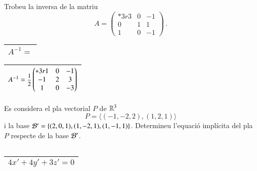 \documentclass[11pt,catalan]{article}
\begin{document}
\begin{enunciat}
Trobeu la inversa de la matriu 
\[
  A = \begin{pmatrix}{*{3}r} 3 & 0 & -1\\ 0 & 1 & 1\\ 1 & 0 & -1\end{pmatrix}\,.
\]
\end{enunciat}

\begin{quadricula}
\begin{tabular}{|L{5cm}{1.25cm}|}
\hline
$A^{-1}=$ \\
\hline
\end{tabular}
\end{quadricula}

\begin{solucio}
\begin{center}
\begin{tabular}{|C{5cm}{1.25cm}|}
\hline
$A^{-1}=\deufrac{1}{2}\begin{pmatrix}{*{3}r} 1 & 0 & -1\\ -1 & 2 & 3\\ 1 & 0 & -3\end{pmatrix}$ \\
\hline
\end{tabular}
\end{center}
\end{solucio}


\begin{enunciat}
Es considera el pla vectorial $P$ de $\rn 3$
\[
  P = \langle (-1,-2,2), (1,2,1) \rangle
\]
i la base $\cal B'=\{(2,0,1),(1,-2,1),(1,-1,1)\}$. Determineu l'equació implícita del pla $P$ respecte de la base $\cal B'$.
\end{enunciat}

\begin{quadricula}
\begin{tabular}{|C{5cm}{0.5cm}|}
\hline
 \\
\hline
\end{tabular}
\end{quadricula}

\begin{solucio}
\begin{center}
\begin{tabular}{|C{5cm}{0.5cm}|}
\hline
$4 x' + 4 y' + 3 z' = 0$ \\
\hline
\end{tabular}
\end{center}
\end{solucio}
\end{document}
